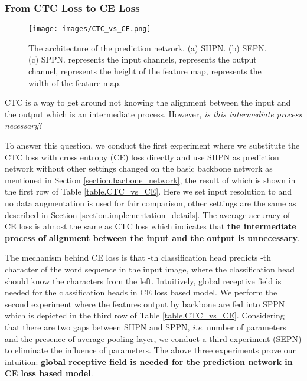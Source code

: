 \documentclass[final]{cvpr}
\begin{document}
\subsubsection{From CTC Loss to CE Loss}
\label{section.from_CTC_loss_to_CE_loss}

\begin{figure*}[ht]
\centering
  \texttt{[image: images/CTC\_vs\_CE.png]}
\centering
\caption{The architecture of the prediction network. (a) SHPN. (b) SEPN. (c) SPPN.  represents the input channels,  represents the output channel,  represents the height of the feature map,  represents the width of the feature map.}
\label{fig.CTC_vs_CE}
\end{figure*}

CTC is a way to get around not knowing the alignment between the input and the output which is an intermediate process. However, \textit{is this intermediate process necessary}?

To answer this question, we conduct the first experiment where we substitute the CTC loss with cross entropy (CE) loss directly and use SHPN as prediction network without other settings changed on the basic backbone network \cite{cheng2017focusing} as mentioned in Section \ref{section.bacbone_network}, the result of which is shown in the first row of Table \ref{table.CTC_vs_CE}. Here we set input resolution to  and no data augmentation is used for fair comparison, other settings are the same as described in Section \ref{section.implementation_details}. The average accuracy of CE loss is almost the same as CTC loss which indicates that \textbf{the intermediate process of alignment between the input and the output is unnecessary}.

The mechanism behind CE loss is that -th classification head predicts -th character of the word sequence in the input image, where the classification head should know the  characters from the left. Intuitively, global receptive field is needed for the classification heads in CE loss based model. We perform the second experiment where the features output by backbone are fed into SPPN which is depicted in the third row of Table \ref{table.CTC_vs_CE}. Considering that there are two gaps between SHPN and SPPN, \textit{i.e.} number of parameters and the presence of average pooling layer, we conduct a third experiment (SEPN) to eliminate the influence of parameters. The above three experiments prove our intuition: \textbf{global receptive field is needed for the prediction network in CE loss based model}.
\end{document}
